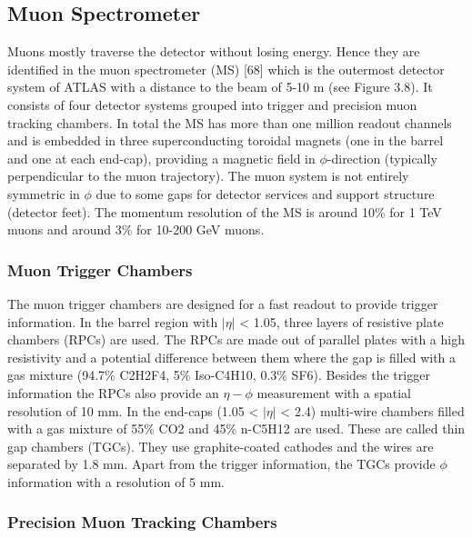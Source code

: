 
\subsection{Muon Spectrometer}

Muons mostly traverse the detector without losing energy. Hence they are identified in the muon spectrometer (MS) [68] which is the outermost detector system of ATLAS with a distance to the beam of 5-10 m (see Figure 3.8). It consists of four detector systems grouped into trigger and precision muon tracking chambers. In total the MS has more than one million readout channels and is embedded in three superconducting toroidal magnets (one in the barrel and one at each end-cap), providing a magnetic field in $\phi$-direction (typically perpendicular to the muon trajectory). The muon system is not entirely symmetric in $\phi$ due to some gaps for detector services and support structure (detector feet). The momentum resolution of the MS is around 10\% for 1 TeV muons and around 3\% for 10-200 GeV muons.


\subsubsection*{Muon Trigger Chambers}

The muon trigger chambers are designed for a fast readout to provide trigger information. In the barrel region with $|\eta|$ < 1.05, three layers of resistive plate chambers (RPCs) are used. The RPCs are made out of parallel plates with a high resistivity and a potential difference between them where the gap is filled with a gas mixture (94.7\% C2H2F4, 5\% Iso-C4H10, 0.3\% SF6). Besides the trigger information the RPCs also provide an $\eta-\phi$ measurement with a spatial resolution of 10 mm. In the end-caps (1.05 < $|\eta|$ < 2.4) multi-wire chambers filled with a gas mixture of 55\% CO2 and 45\% n-C5H12 are used. These are called thin gap chambers (TGCs). They use graphite-coated cathodes and the wires are separated by 1.8 mm. Apart from the trigger information, the TGCs provide $\phi$ information with a resolution of 5 mm.

\subsubsection*{Precision Muon Tracking Chambers}

